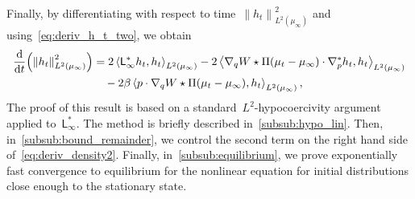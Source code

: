 \documentclass[onefignum,onetabnum]{siamart251216} %
\renewcommand{\d}{\mathrm{d}}
\newcommand{\norm}[1]{\left\lVert#1\right\rVert}
\newcommand{\mescin}{\mu}
\newcommand{\projp}{\Pi}
\newcommand{\adj}{\mathsf{L}_\infty^*}
\newcommand{\slangle}[1]{\left\langle #1 \right\rangle}
\newcommand{\norml}[1]{\norm{#1}_{L^2(\mescin_\infty)}}
\theoremstyle{plain}
\numberwithin{equation}{section}
\numberwithin{theorem}{section}
\begin{document}
Finally, by differentiating with respect to time~$\norml{h_t}^2$ and using~\eqref{eq:deriv_h_t_two}, we obtain
\begin{align}
    \label{eq:deriv_density2}
    \frac{\d}{\d t}\!\left(\norm{h_t}_{L^2(\mescin_\infty)}^2\right) &= 2\slangle{\adj h_t, h_t}_{L^2(\mescin_\infty)}- 2\slangle{\nabla_q W \star \projp (\mescin_t - \mescin_\infty)\cdot\nabla_p^* h_t, h_t}_{L^2(\mescin_\infty)} \\
    \notag
    &\quad - 2\beta\slangle{ p\cdot\nabla_q W \star \projp (\mescin_t - \mescin_\infty), h_t}_{L^2(\mescin_\infty)},
\end{align}
The proof of this result is based on a standard~$L^2$-hypocoercivity argument applied to~$\adj$. The method is briefly described in~\cref{subsub:hypo_lin}. Then, in~\cref{subsub:bound_remainder}, we control the second term on the right hand side of~\eqref{eq:deriv_density2}.
Finally, in~\cref{subsub:equilibrium}, we prove exponentially fast convergence to equilibrium for the nonlinear equation for initial distributions close enough to the stationary state.
%
%
\end{document}
